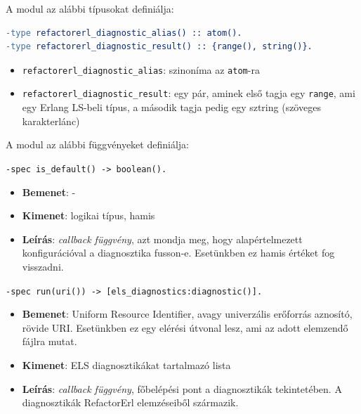 A modul az alábbi típusokat definiálja:

\begin{lstlisting}[language={erlang}]
-type refactorerl_diagnostic_alias() :: atom().
-type refactorerl_diagnostic_result() :: {range(), string()}.
\end{lstlisting}



\begin{itemize}
    \item \lstinline{refactorerl_diagnostic_alias}: szinoníma az \lstinline{atom}-ra
    \item \lstinline{refactorerl_diagnostic_result}: egy pár, aminek első tagja egy \lstinline{range}, ami egy Erlang LS-beli típus, a második tagja pedig egy sztring (szöveges karakterlánc)
\end{itemize}

\noindent A modul az alábbi függvényeket definiálja:

\noindent \lstinline{-spec is_default() -> boolean().}
        \begin{itemize}
            \item \textbf{Bemenet}: -
            \item \textbf{Kimenet}: logikai típus, hamis
            \item \textbf{Leírás}: \textit{callback függvény}, azt mondja meg, hogy alapértelmezett konfigurációval a diagnosztika fusson-e. Esetünkben ez hamis értéket fog visszadni.
        \end{itemize}
     
\noindent \lstinline{-spec run(uri()) -> [els_diagnostics:diagnostic()].}
        \begin{itemize}
            \item \textbf{Bemenet}: Uniform Resource Identifier, avagy univerzális erőforrás aznosító, rövide URI. Esetünkben ez egy elérési útvonal lesz, ami az adott elemzendő fájlra mutat.
            \item \textbf{Kimenet}: ELS diagnosztikákat tartalmazó lista
            \item \textbf{Leírás}: \textit{callback függvény}, főbelépési pont a diagnosztikák tekintetében. A diagnosztikák RefactorErl elemzéseiből származik.
        \end{itemize}
    
